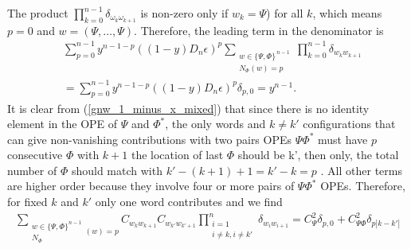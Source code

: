 \documentclass[11pt]{article}
\newcommand{\ep}{\epsilon}
\newcommand{\nn}{\nonumber}
\newcommand{\JM}[1]{\textcolor{orange}{#1}}
\begin{document}
  
  
  The product $\prod_{k=0}^{n-1}\delta_{\omega_k\omega_{k+1}}$ is non-zero only if $w_k=\Psi$) for all $k$, which means $p=0$ and 
  $w=(\Psi,\dots,\Psi)$. Therefore, the leading term in the denominator is
  \begin{align}
    &\sum_{p=0}^{n-1}y^{n-1-p}((1-y)D_n\ep)^p\sum_{\substack{w\in\{\Psi,\Phi\}^{\,n-1}\\ N_\Phi(w)=p}}\prod_{k=0}^{n-1}\delta_{w_kw_  {k+1}}\nn\\
    &=\sum_{p=0}^{n-1}y^{n-1-p}((1-y) D_n\ep)^p\delta_{p,0}=y^{n-1}.
  \end{align}
It is clear from (\ref{gnw_1_minus_x_mixed}) that since there is no identity element in the OPE of 
$\Psi$ and $\Phi^*$, the only words and $k\neq k'$ configurations that can give non-vanishing contributions with two pairs OPEs $\Psi\Phi^*$ must have $p$ consecutive $\Phi$ with $k+1$ the 
location of last $\Phi$ should be k', then only, the total number of $\Phi$ should match with $k' - (k+1) +1 = k'-k =  p$
. All other terms are higher order because they involve four or more pairs of $\Psi\Phi^*$ OPEs.
Therefore, for fixed $k$ and $k'$ only one word contributes and we find
\begin{align}
  \sum_{\substack{w\in \{\Psi,\Phi\}^{n-1}\\N_\Phi}(w)=p}C_{w_k w_{k+1}}C_{w_{k'}w_{k'+1}}\prod_{\substack{i=1\\i\neq k,i\neq k'}}^n  \delta_{w_i w_{i+1}} =C_\Psi^2\delta_{p,0}+C_{\Psi\Phi}^2\delta_{p |k-k'|}
\end{align}
\end{document}
